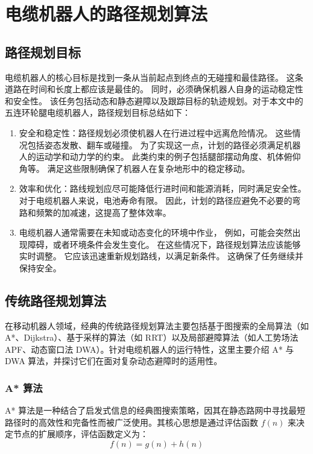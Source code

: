 \chapter{电缆机器人的路径规划算法}\label{chap:path_planning}
\section{路径规划目标}

电缆机器人的核心目标是找到一条从当前起点到终点的无碰撞和最佳路径。 这条道路在时间和长度上都应该是最佳的。 同时，必须确保机器人自身的运动稳定性和安全性。 该任务包括动态和静态避障以及跟踪目标的轨迹规划。\cite{use-gru2}对于本文中的五连环轮腿电缆机器人，路径规划目标总结如下：

\begin{enumerate}
\item 安全和稳定性：路径规划必须使机器人在行进过程中远离危险情况。 这些情况包括姿态发散、翻车或碰撞。 为了实现这一点，计划的路径必须满足机器人的运动学和动力学的约束。 此类约束的例子包括腿部摆动角度、机体俯仰角等。 满足这些限制确保了机器人在复杂地形中的稳定移动。

\item 效率和优化：路线规划应尽可能降低行进时间和能源消耗，同时满足安全性。 对于电缆机器人来说，电池寿命有限。 因此，计划的路径应避免不必要的弯路和频繁的加减速，这提高了整体效率。

\item 电缆机器人通常需要在未知或动态变化的环境中作业， 例如，可能会突然出现障碍，或者环境条件会发生变化。 在这些情况下，路径规划算法应该能够实时调整。 它应该迅速重新规划路线，以满足新条件。 这确保了任务继续并保持安全。

\end{enumerate}

\section{传统路径规划算法}
在移动机器人领域，经典的传统路径规划算法主要包括基于图搜索的全局算法（如 A*、Dijkstra）、基于采样的算法（如 RRT）以及局部避障算法（如人工势场法 APF、动态窗口法 DWA）。\cite{wu2022dynamic}针对电缆机器人的运行特性，这里主要介绍 A* 与 DWA 算法，并探讨它们在面对复杂动态避障时的适用性。

\subsection{A* 算法}
A* 算法是一种结合了启发式信息的经典图搜索策略，因其在静态路网中寻找最短路径时的高效性和完备性而被广泛使用。\cite{astar}其核心思想是通过评估函数 $f(n)$ 来决定节点的扩展顺序，评估函数定义为：
\begin{equation}
    f(n) = g(n) + h(n)
\end{equation}

